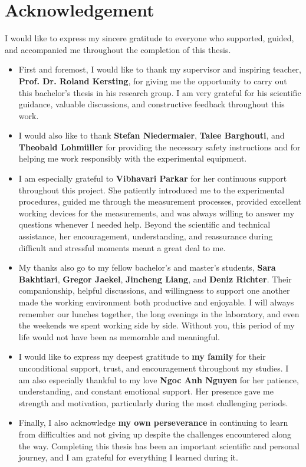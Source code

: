 \chapter*{Acknowledgement}
\thispagestyle{plain}

I would like to express my sincere gratitude to everyone who supported, guided, and accompanied me throughout the completion of this thesis.

\begin{itemize}
    \item First and foremost, I would like to thank my supervisor and inspiring teacher, \textbf{Prof. Dr. Roland Kersting}, for giving me the opportunity to carry out this bachelor's thesis in his research group. I am very grateful for his scientific guidance, valuable discussions, and constructive feedback throughout this work.

    \item I would also like to thank \textbf{Stefan Niedermaier}, \textbf{Talee Barghouti}, and \textbf{Theobald Lohmüller} for providing the necessary safety instructions and for helping me work responsibly with the experimental equipment.

    \item I am especially grateful to \textbf{Vibhavari Parkar} for her continuous support throughout this project. She patiently introduced me to the experimental procedures, guided me through the measurement processes, provided excellent working devices for the measurements, and was always willing to answer my questions whenever I needed help. Beyond the scientific and technical assistance, her encouragement, understanding, and reassurance during difficult and stressful moments meant a great deal to me.


    \item My thanks also go to my fellow bachelor's and master's students, \textbf{Sara Bakhtiari}, \textbf{Gregor Jaekel}, \textbf{Jincheng Liang}, and \textbf{Deniz Richter}. Their companionship, helpful discussions, and willingness to support one another made the working environment both productive and enjoyable. I will always remember our lunches together, the long evenings in the laboratory, and even the weekends we spent working side by side. Without you, this period of my life would not have been as memorable and meaningful.

    \item I would like to express my deepest gratitude to \textbf{my family} for their unconditional support, trust, and encouragement throughout my studies. I am also especially thankful to my love \textbf{Ngoc Anh Nguyen} for her patience, understanding, and constant emotional support. Her presence gave me strength and motivation, particularly during the most challenging periods.

    \item Finally, I also acknowledge \textbf{my own perseverance} in continuing to learn from difficulties and not giving up despite the challenges encountered along the way. Completing this thesis has been an important scientific and personal journey, and I am grateful for everything I learned during it.
\end{itemize}